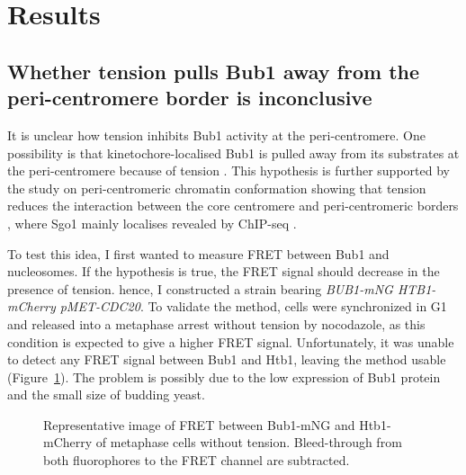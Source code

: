 

\section{Results}
\subsection{Whether tension pulls Bub1 away from the peri-centromere border is inconclusive}
It is unclear how tension inhibits Bub1 activity at the peri-centromere. One possibility is that kinetochore-localised Bub1 is pulled away from its substrates at the peri-centromere because of tension \citep{Nerusheva2014}. This hypothesis is further supported by the study on peri-centromeric chromatin conformation showing that tension reduces the interaction between the core centromere and peri-centromeric borders \citep{Paldi2020ConvergentPericentromeres}, where Sgo1 mainly localises revealed by ChIP-seq \citep{Verzijlbergen2014, Deng2018}. 

To test this idea, I first wanted to measure FRET between Bub1 and nucleosomes. If the hypothesis is true, the FRET signal should decrease in the presence of tension. hence, I constructed a strain bearing \textit{BUB1-mNG HTB1-mCherry pMET-CDC20}. To validate the method, cells were synchronized in G1 and released into a metaphase arrest without tension by nocodazole, as this condition is expected to give a higher FRET signal. Unfortunately, it was unable to detect any FRET signal between Bub1 and Htb1, leaving the method usable (Figure~\ref{fig:FRET}). The problem is possibly due to the low expression of Bub1 protein and the small size of budding yeast. 

\begin{figure}[htbp]
  \centering
  
  \caption[Representative image of FRET between Bub1-mNG and Htb1-mCherry of metaphase cells without tension]{Representative image of FRET between Bub1-mNG and Htb1-mCherry of metaphase cells without tension. Bleed-through from both fluorophores to the FRET channel are subtracted. }
  \label{fig:FRET}
\end{figure} 

